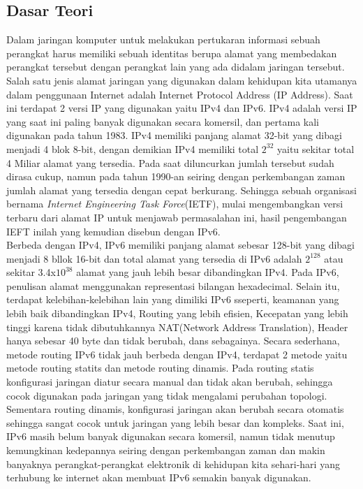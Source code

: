 \subsection{Dasar Teori}
Dalam jaringan komputer untuk melakukan pertukaran informasi sebuah perangkat harus memiliki sebuah identitas berupa alamat yang membedakan perangkat tersebut dengan perangkat lain yang ada didalam jaringan tersebut. Salah satu jenis alamat jaringan yang digunakan dalam kehidupan kita utamanya dalam penggunaan Internet adalah Internet Protocol Address (IP Address).
Saat ini terdapat 2 versi IP yang digunakan yaitu IPv4 dan IPv6. IPv4 adalah versi IP yang saat ini paling banyak digunakan secara komersil, dan pertama kali digunakan pada tahun 1983. IPv4 memiliki panjang alamat 32-bit yang dibagi menjadi 4 blok 8-bit, dengan demikian IPv4 memiliki total $2^{32}$ yaitu sekitar total 4 Miliar alamat yang tersedia. Pada saat diluncurkan jumlah tersebut sudah dirasa cukup, namun pada tahun 1990-an seiring dengan perkembangan zaman jumlah alamat yang tersedia dengan cepat berkurang. Sehingga sebuah organisasi bernama \textit{Internet Engineering Task Force}(IETF), mulai mengembangkan versi terbaru dari alamat IP untuk menjawab permasalahan ini, hasil pengembangan IEFT inilah yang kemudian disebun dengan IPv6.\\
Berbeda dengan IPv4, IPv6 memiliki panjang alamat sebesar 128-bit yang dibagi menjadi 8 bllok 16-bit dan total alamat yang tersedia di IPv6 adalah $2^{128}$ atau sekitar 3.4x$10^{38}$ alamat yang jauh lebih besar dibandingkan IPv4. Pada IPv6, penulisan alamat menggunakan representasi bilangan hexadecimal. Selain itu, terdapat kelebihan-kelebihan lain yang dimiliki IPv6 sseperti, keamanan yang lebih baik dibandingkan IPv4, Routing yang lebih efisien, Kecepatan yang lebih tinggi karena tidak dibutuhkannya NAT(Network Address Translation), Header hanya sebesar 40 byte dan tidak berubah, dans sebagainya. Secara sederhana, metode routing IPv6 tidak jauh berbeda dengan IPv4, terdapat 2 metode yaitu metode routing statits dan metode routing dinamis. Pada routing statis konfigurasi jaringan diatur secara manual dan tidak akan berubah, sehingga cocok digunakan pada jaringan yang tidak mengalami perubahan topologi. Sementara routing dinamis, konfigurasi jaringan akan berubah secara otomatis sehingga sangat cocok untuk jaringan yang lebih besar dan kompleks. Saat ini, IPv6 masih belum banyak digunakan secara komersil, namun tidak menutup kemungkinan kedepannya seiring dengan perkembangan zaman dan makin banyaknya perangkat-perangkat elektronik di kehidupan kita sehari-hari yang terhubung ke internet akan membuat IPv6 semakin banyak digunakan.\\ 


